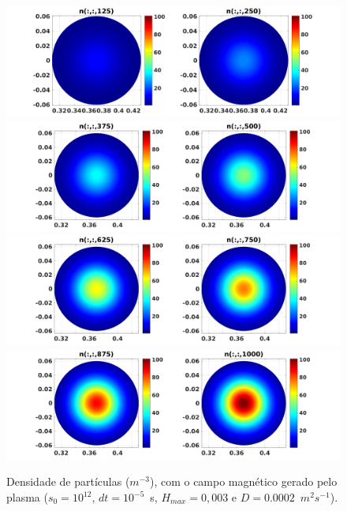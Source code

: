 \documentclass[12pt,oneside,a4paper]{abntex2}
\begin{document}
\begin{figure}[H]
\centering
\includegraphics[scale=0.5]{../SImulacao_breakdown/PDE/ntod1B7.png}  
\includegraphics[scale=0.5]{../SImulacao_breakdown/PDE/ntod2B7.png} 
\includegraphics[scale=0.5]{../SImulacao_breakdown/PDE/ntod3B7.png} 
\includegraphics[scale=0.5]{../SImulacao_breakdown/PDE/ntod4B7.png} 
\caption{Densidade de partículas ($m^{-3}$), com o campo magnético gerado pelo plasma ($s_0=10^{12}$, $dt=10^{-5}$\ s, $H_{max} = 0,003$ e $D=0.0002$\ $m^2s^{-1}$).}
\label{campplasmasi3l1}
\end{figure}
\end{document}
